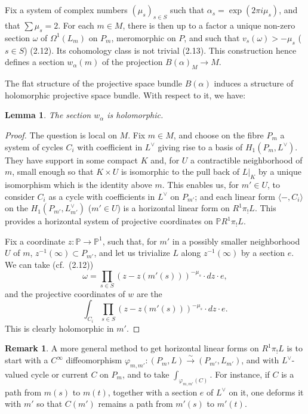 \documentclass[12pt,a4paper]{article}
\theoremstyle{plain}
\newtheorem{lemma}[theorem]{Lemma}
\theoremstyle{definition}
\newtheorem{remark}[theorem]{Remark}
\theoremstyle{remark}
\newcommand{\PP}{\mathbb{P}}
\numberwithin{equation}{section}
\providecommand{\PP}{\mathbb{P}}
\begin{document}
\subsection{}
Fix a system of complex numbers $(\mu_s)_{s \in S}$ such that $\alpha_s = \exp(2\pi i \mu_s)$, and that $\sum \mu_s = 2$. For each $m \in M$, there is then up to a factor a unique non-zero section $\omega$ of $\Omega^1(L_m)$ on $P_m$, meromorphic on $P$, and such that $v_s(\omega) > -\mu_s$ ($s \in S$) (2.12). Its cohomology class is not trivial (2.13). This construction hence defines a section $w_\alpha(m)$ of the projection $B(\alpha)_M \to M$.

The flat structure of the projective space bundle $B(\alpha)$ induces a structure of holomorphic projective space bundle. With respect to it, we have:

\begin{lemma}\label{lem:3.5}
The section $w_\alpha$ is holomorphic.
\end{lemma}

\begin{proof}
The question is local on $M$. Fix $m \in M$, and choose on the fibre $P_m$ a system of cycles $C_i$ with coefficient in $L^\vee$ giving rise to a basis of $H_1(P_m, L^\vee)$. They have support in some compact $K$ and, for $U$ a contractible neighborhood of $m$, small enough so that $K \times U$ is isomorphic to the pull back of $L|_K$ by a unique isomorphism which is the identity above $m$. This enables us, for $m' \in U$, to consider $C_i$ as a cycle with coefficients in $L^\vee$ on $P_{m'}$; and each linear form $\langle -, C_i \rangle$ on the $H_1(P_{m'}, L_{m'}^\vee)$ ($m' \in U$) is a horizontal linear form on $R^1\pi_!L$. This provides a horizontal system of projective coordinates on $\PP R^1\pi_!L$.

Fix a coordinate $z: \PP \to \PP^1$, such that, for $m'$ in a possibly smaller neighborhood $U$ of $m$, $z^{-1}(\infty) \subset P_{m'}$, and let us trivialize $L$ along $z^{-1}(\infty)$ by a section $e$. We can take (cf.\ (2.12))
\[
\omega = \prod_{s \in S} (z - z(m'(s)))^{-\mu_s} \cdot dz \cdot e,
\]
and the projective coordinates of $w$ are the
\[
\int_{C_i} \prod_{s \in S} (z - z(m'(s)))^{-\mu_s} \cdot dz \cdot e.
\]
This is clearly holomorphic in $m'$.
\end{proof}

\begin{remark}\label{rmk:3.6}
A more general method to get horizontal linear forms on $R^1\pi_!L$ is to start with a $C^\infty$ diffeomorphism $\varphi_{m,m'}: (P_m, L) \xrightarrow{\sim} (P_{m'}, L_{m'})$, and with $L^\vee$-valued cycle or current $C$ on $P_m$, and to take $\int_{\varphi_{m,m'}(C)}$. For instance, if $C$ is a path from $m(s)$ to $m(t)$, together with a section $e$ of $L^\vee$ on it, one deforms it with $m'$ so that $C(m')$ remains a path from $m'(s)$ to $m'(t)$.
\end{remark}
\end{document}
